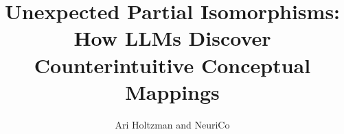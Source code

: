 \documentclass{article}
\title{Unexpected Partial Isomorphisms: How LLMs Discover\\Counterintuitive Conceptual Mappings}
\author{Ari Holtzman and NeuriCo}
\begin{document}
\maketitle

\begin{abstract}

\end{abstract}










\end{document}
